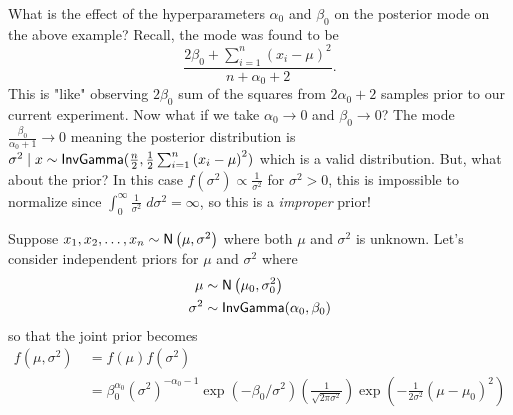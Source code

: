 \begin{exam} \label{exam: bay_norm_3}
    What is the effect of the hyperparameters $\alpha_0$ and $\beta_0$ on the posterior mode on the above example? Recall, the mode was found to be
    \[
        \frac{2 \beta_0 + \sum_{i=1}^{n} \left( x_i - \mu \right)^2}{n + \alpha_0 + 2}.
    \]
    This is "like" observing $2 \beta_0$ sum of the squares from $2 \alpha_0 + 2$ samples prior to our current experiment. Now what if we take $\alpha_0 \to 0$ and $\beta_0 \to 0$? The mode $\frac{\beta_0}{\alpha_0 + 1} \to 0$ meaning the posterior distribution is $\sigma^2 \mid x \sim {\sf InvGamma} (\frac{n}{2} , \frac{1}{2} \sum_{i=1}^{n} \left( x_i - \mu \right)^2)$ which is a valid distribution. But, what about the prior? In this case $f(\sigma^2) \propto \frac{1}{\sigma^2}$ for $\sigma^2 > 0$, this is impossible to normalize since $\int_{0}^{\infty} \frac{1}{\sigma^2} \; d \sigma^2 = \infty$, so this is a {\it improper} prior!
\end{exam}

\begin{exam} \label{exam: bay_norm_4}
    Suppose $x_1 , x_2 , \ldots , x_n \sim {\sf N} \left( \mu , \sigma^2 \right)$ where both $\mu$ and $\sigma^{2}$ is unknown. Let's consider independent priors for $\mu$ and $\sigma^2$ where
    \begin{align*}
        \mu      & \sim {\sf N} \left( \mu_0 , \sigma_0^2 \right) \\
        \sigma^2 & \sim {\sf InvGamma} (\alpha_0 , \beta_0)
    \end{align*}
    so that the joint prior becomes
    \begin{align*}
        f(\mu,\sigma^2) \
         & = f(\mu) f(\sigma^2)                                                                                                                                                                                                        \\
         & = \beta_0^{\alpha_0} \left( \sigma^2 \right)^{-\alpha_0 - 1} \exp \left( - \beta_0 / \sigma^2 \right) \left( \frac{1}{\sqrt{2 \pi \sigma^2}} \right) \exp \left( - \frac{1}{2\sigma^2} \left( \mu - \mu_0 \right)^2 \right)
    \end{align*}
\end{exam}